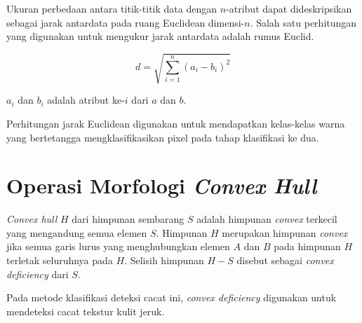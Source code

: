 \documentclass[laporan.tex]{subfiles}
\begin{document}
Ukuran perbedaan antara titik-titik data dengan $n$-atribut dapat dideskripsikan sebagai jarak antardata pada ruang Euclidean dimensi-$n$. Salah satu perhitungan yang digunakan untuk mengukur jarak antardata adalah rumus Euclid.

\begin{equation}
	d=\sqrt{\sum_{i=1}^n (a_i - b_i)^2}
\end{equation}

$a_i$ dan $b_i$ adalah atribut ke-$i$ dari $a$ dan $b$.

Perhitungan jarak Euclidean digunakan untuk mendapatkan kelas-kelas warna yang bertetangga mengklasifikasikan pixel pada tahap klasifikasi ke dua.

\section{Operasi Morfologi \emph{Convex Hull}}

\emph{Convex hull} $H$ dari himpunan sembarang $S$ adalah himpunan \emph{convex} terkecil yang mengandung semua elemen $S$. Himpunan $H$ merupakan himpunan \emph{convex} jika semua garis lurus yang menghubungkan elemen $A$ dan $B$ pada himpunan $H$ terletak seluruhnya pada $H$. Selisih himpunan $H - S$ disebut sebagai \emph{convex deficiency} dari $S$.

Pada metode klasifikasi deteksi cacat ini, \emph{convex deficiency} digunakan untuk mendeteksi cacat tekstur kulit jeruk.
\end{document}
